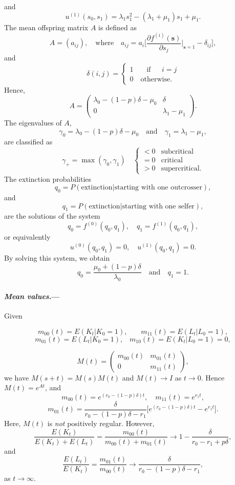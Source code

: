 \documentclass[a4paper,11pt]{article}
\theoremstyle{plain}
\theoremstyle{definition}
\numberwithin{equation}{section}
\begin{document}
and
\[
u^{(1)}(s_0,s_1)=\lambda_1s_1^2-(\lambda_1+\mu_1)s_1+\mu_1.
\]
The mean offspring matrix $A$ is defined as
\[
A=(a_{ij}),\quad \mbox{where} \quad a_{ij}=a_i\Big[\frac{\partial
  f^{(i)}(\mathbf{s})}{\partial s_j}\Big|_{\mathbf{s}=1}-\delta_{ij}\Big],
\]
and
\[
\delta(i,j)= \left\{
\begin{array}{cc}
1 \quad \;\;\; \mbox{if} \;\; \quad i=j\\
0 \quad \mbox{otherwise}. 
\end{array}
\right.
\]
Hence,
\[
A=\left(
\begin{array}{cc}
 \lambda_0-(1-p)\delta-\mu_0& \delta\\
0 & \lambda_1-\mu_1
\end{array}\right).
\]
The eigenvalues of $A$,
\[
\gamma_0=\lambda_0-(1-p)\delta-\mu_0 \quad \mbox{and} \quad \gamma_1=\lambda_1-\mu_1,
\]
are classified as
\[
\gamma_+=\max(\gamma_0,\gamma_1)\quad \left\{
\begin{array}{lc}
<0 & \mbox{subcritical}\\
=0 & \mbox{critical}\\
>0 & \mbox{supercritical}.
\end{array}\right.
\]
The extinction probabilities
\[
q_0=P(\mbox{extinction}|\mbox{starting with one outcrosser}),
\]
and
\[
q_1=P(\mbox{extinction}|\mbox{starting with one selfer}),
\]
are the solutions of the system
\[
q_0=f^{(0)}(q_0,q_1),\quad q_1=f^{(1)}(q_0,q_1),
\]
or equivalently
\[
u^{(0)}(q_0,q_1)=0,\quad u^{(1)}(q_0,q_1)=0.
\]
By solving this system, we obtain
\[
q_0=\frac{\mu_0+(1-p)\delta}{\lambda_0} \quad \mbox{and} \quad  q_1=1.
\]

\paragraph{\textit{Mean values}.---} 
Given 

\[
m_{00}(t)=E(K_t|K_0=1), \quad \;\;\; m_{11}(t)=E(L_t|L_0=1),
\]
\[
m_{01}(t)=E(L_t|K_0=1), \;\;\; m_{10}(t)=E(K_t|L_0=1)=0,
\]

\[
M(t)=\left(
\begin{array}{cc}
m_{00}(t) & m_{01}(t)\\
0 & m_{11}(t)
\end{array}\right),
\]
we have $M(s+t)=M(s)M(t)$ and $M(t)\to I$ as $t\to 0$. Hence
$M(t)=e^{At}$, and
\[
m_{00}(t)=e^{(r_0-(1-p)\delta)t},\quad m_{11}(t)=e^{r_1t},
\]
\[
m_{01}(t)=\frac{\delta}{r_0-(1-p)\delta-r_1}\big[e^{(r_0-(1-p)\delta)t}-e^{r_1t}\big].
\]
Here, $M(t)$ is {\it not} positively regular.  However,
\[
\frac{E(K_t)}{E(K_t)+E(L_t)}=\frac{m_{00}(t)}{m_{00}(t)+m_{01}(t)}
\to 1-\frac{\delta}{r_0-r_1+p\delta},
\]
and
\[
\frac{E(L_t)}{E(K_t)}= \frac{m_{01}(t)}{m_{00}(t)} \to
\frac{\delta}{r_0-(1-p)\delta-r_1},
\]
as $t\to\infty$.


   
\end{document}
